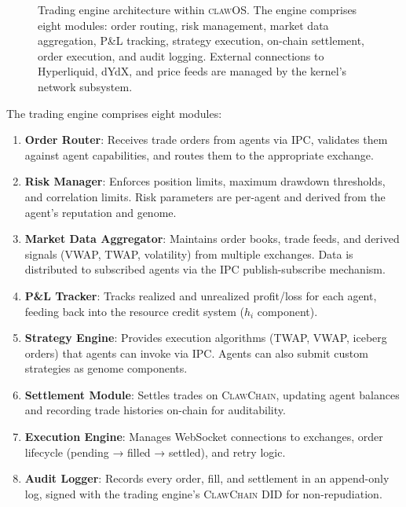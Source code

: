 \documentclass{article}
\newcommand{\clawos}{\textsc{clawOS}}
\newcommand{\clawchain}{\textsc{ClawChain}}
\begin{document}
\begin{figure}[t]
\caption{Trading engine architecture within \clawos{}. The engine comprises eight modules: order routing, risk management, market data aggregation, P\&L tracking, strategy execution, on-chain settlement, order execution, and audit logging. External connections to Hyperliquid, dYdX, and price feeds are managed by the kernel's network subsystem.}
\label{fig:trading}
\end{figure}

The trading engine comprises eight modules:

\begin{enumerate}[leftmargin=*]
    \item \textbf{Order Router}: Receives trade orders from agents via IPC, validates them against agent capabilities, and routes them to the appropriate exchange.
    
    \item \textbf{Risk Manager}: Enforces position limits, maximum drawdown thresholds, and correlation limits. Risk parameters are per-agent and derived from the agent's reputation and genome.
    
    \item \textbf{Market Data Aggregator}: Maintains order books, trade feeds, and derived signals (VWAP, TWAP, volatility) from multiple exchanges. Data is distributed to subscribed agents via the IPC publish-subscribe mechanism.
    
    \item \textbf{P\&L Tracker}: Tracks realized and unrealized profit/loss for each agent, feeding back into the resource credit system ($h_i$ component).
    
    \item \textbf{Strategy Engine}: Provides execution algorithms (TWAP, VWAP, iceberg orders) that agents can invoke via IPC. Agents can also submit custom strategies as genome components.
    
    \item \textbf{Settlement Module}: Settles trades on \clawchain{}, updating agent balances and recording trade histories on-chain for auditability.
    
    \item \textbf{Execution Engine}: Manages WebSocket connections to exchanges, order lifecycle (pending → filled → settled), and retry logic.
    
    \item \textbf{Audit Logger}: Records every order, fill, and settlement in an append-only log, signed with the trading engine's \clawchain{} DID for non-repudiation.
\end{enumerate}
\end{document}
